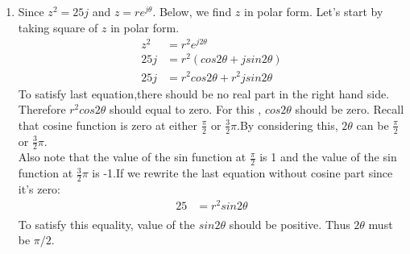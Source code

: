 \documentclass[10pt,a4paper, margin=1in]{article}
\begin{document}
\begin{enumerate}
\begin{enumerate}
\begin{itemize}

		
	\end{itemize}
    \item %
    Since $z^2=25j$ and $z= re^{j\theta}$. Below, we find $z$ in polar form.
    Let's start by taking square of $z$ in polar form.\\
        \begin{equation}
	\begin{split}
		z^2 & = r^2 e^{j2\theta}\\
		25j & = r^2 (cos2\theta + j sin2\theta)\\
		25j & = r^2cos2\theta + r^2jsin2\theta 
	\end{split}
	\end{equation}To satisfy last equation,there should be no real part in the right hand side. Therefore $r^2cos2\theta$ should equal to zero. For this , $cos2\theta$ should be zero.
	Recall that cosine function is zero at either $\frac{\pi}{2}$ or $\frac{3}{2}\pi$.By considering this, $2\theta$ can be $\frac{\pi}{2}$ or $\frac{3}{2}\pi$. \\
	Also note that the value of the sin function at $\frac{\pi}{2}$ is 1 and the value of the sin function at $\frac{3}{2}\pi$ is -1.If we rewrite the last equation without cosine part since it's zero:
	 \begin{equation}
	\begin{split}
		25 & = r^2 sin2\theta\\
	\end{split}
	\end{equation}
	To satisfy this equality, value of the $sin2\theta$ should be positive. Thus $2\theta$ must be $\pi/2$.
	

\end{enumerate}
\end{enumerate}
\end{document}
